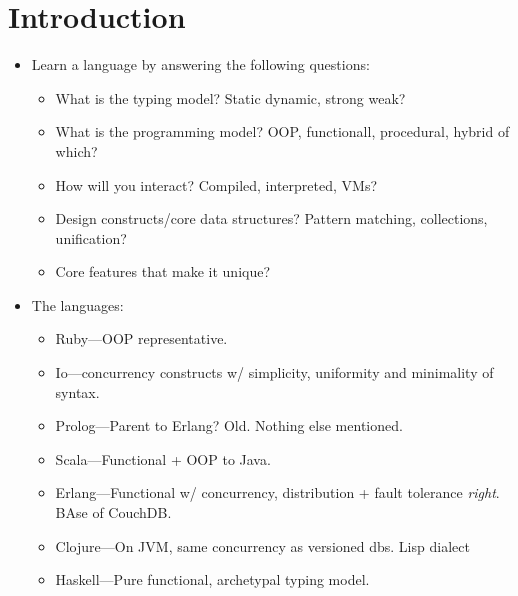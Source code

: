 \documentclass[10pt, twocolumn, landscape]{article}
\begin{document}
\onehalfspacing

\pagestyle{fancy}
\cfoot{\thepage/\pageref{LastPage}}

\tableofcontents

\newpage

\section{Introduction}

\begin{itemize}
    \item Learn a language by answering the following questions:
        \begin{itemize}
            \item What is the typing model? Static dynamic, strong weak?
            \item What is the programming model? OOP, functionall, procedural,
                hybrid of which?
            \item How will you interact? Compiled, interpreted, VMs?
            \item Design constructs/core data structures? Pattern matching,
                collections, unification?
            \item Core features that make it unique?
        \end{itemize}

    \item The languages:
        \begin{itemize}
            \item Ruby---OOP representative.
            \item Io---concurrency constructs w/ simplicity, uniformity and
                minimality of syntax.
            \item Prolog---Parent to Erlang? Old. Nothing else mentioned.
            \item Scala---Functional + OOP to Java.
            \item Erlang---Functional w/ concurrency, distribution + fault
                tolerance \emph{right}. BAse of CouchDB.\@
            \item Clojure---On JVM, same concurrency as versioned dbs. Lisp
                dialect
            \item Haskell---Pure functional, archetypal typing model.
        \end{itemize}


\end{itemize}
\end{document}
